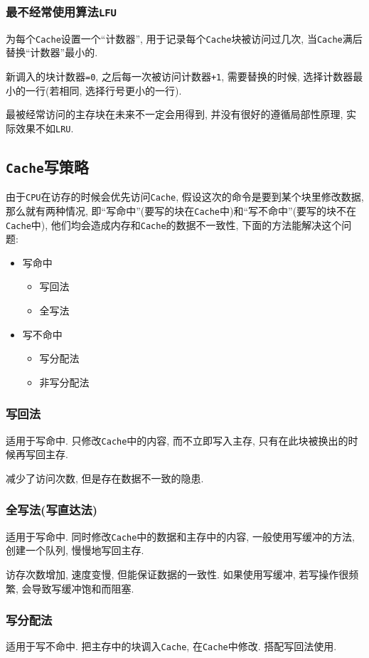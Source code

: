 \subsubsection{最不经常使用算法\texttt{LFU}}
为每个\verb|Cache|设置一个``计数器'', 用于记录每个\verb|Cache|块被访问过几次, 当\verb|Cache|满后替换``计数器''最小的. \par
新调入的块计数器\verb|=0|, 之后每一次被访问计数器\verb|+1|, 需要替换的时候, 选择计数器最小的一行(若相同, 选择行号更小的一行). \par
最被经常访问的主存块在未来不一定会用得到, 并没有很好的遵循局部性原理, 实际效果不如\verb|LRU|.
\subsection{\texttt{Cache}写策略}
由于\verb|CPU|在访存的时候会优先访问\verb|Cache|, 假设这次的命令是要到某个块里修改数据, 那么就有两种情况, 即``写命中''(要写的块在\verb|Cache|中)和``写不命中''(要写的块不在\verb|Cache|中), 他们均会造成内存和\verb|Cache|的数据不一致性, 下面的方法能解决这个问题:
\begin{itemize}
\item 写命中
\begin{itemize}
\item 写回法
\item 全写法
\end{itemize}
\item 写不命中
\begin{itemize}
\item 写分配法
\item 非写分配法
\end{itemize}
\end{itemize}
\subsubsection{写回法}
适用于写命中. 只修改\verb|Cache|中的内容, 而不立即写入主存, 只有在此块被换出的时候再写回主存. \par
减少了访问次数, 但是存在数据不一致的隐患.
\subsubsection{全写法(写直达法)}
适用于写命中. 同时修改\verb|Cache|中的数据和主存中的内容, 一般使用写缓冲的方法, 创建一个队列, 慢慢地写回主存. \par 
访存次数增加, 速度变慢, 但能保证数据的一致性. 如果使用写缓冲, 若写操作很频繁, 会导致写缓冲饱和而阻塞.
\subsubsection{写分配法}
适用于写不命中. 把主存中的块调入\verb|Cache|, 在\verb|Cache|中修改. 搭配写回法使用.
